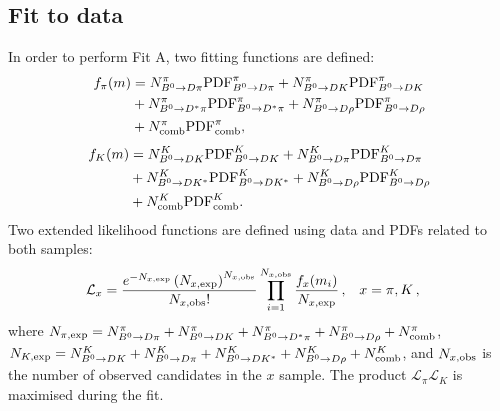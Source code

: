 \subsection{Fit to data}
\label{sec:DataMassFit}

In order to perform Fit A, two fitting functions are defined:
\begin{equation}
	\label{eq:PiSamplePDF}
	\begin{split}
		f_{\pi}(m) &= N^{\pi}_{B^0\rightarrow D\pi}{\rm{PDF}}^{\pi}_{B^0\rightarrow D\pi} + N^{\pi}_{B^0\rightarrow DK}{\rm{PDF}}^{\pi}_{B^0\rightarrow DK} \\
		& + N^{\pi}_{B^0\rightarrow D^*\pi}{\rm{PDF}}^{\pi}_{B^0\rightarrow D^*\pi} + N^{\pi}_{B^0\rightarrow D\rho}{\rm{PDF}}^{\pi}_{B^0\rightarrow D\rho} \\
		& + N^{\pi}_{\rm comb}{\rm{PDF}}^{\pi}_{\rm comb},
	\end{split}
\end{equation}
\begin{equation}
	\label{eq:KSamplePDF}
	\begin{split}
		f_{K}(m) &= N^{K}_{B^0\rightarrow DK}{\rm{PDF}}^{K}_{B^0\rightarrow DK} + N^{K}_{B^0\rightarrow D\pi}{\rm{PDF}}^{K}_{B^0\rightarrow D\pi} \\
		& +N^{K}_{B^0\rightarrow DK^*}{\rm{PDF}}^{K}_{B^0\rightarrow DK^*} + N^{K}_{B^0\rightarrow D\rho}{\rm{PDF}}^{K}_{B^0\rightarrow D\rho} \\
		& +N^{K}_{\rm comb}{\rm{PDF}}^{K}_{\rm comb}.
	\end{split}
\end{equation}
Two extended likelihood functions are defined using data and PDFs related to both samples:
\begin{align}
	\mathcal L_{x} &= \frac{e^{-N_{x,\rm exp}}\left(N_{x,\rm exp}\right)^{N_{x,\rm obs}}}{N_{x,\rm obs}!} \prod\limits_{i=1}^{N_{x,\rm obs}}\frac{f_{x}(m_i)}{N_{x,\rm exp}}\,, & x &= \pi, K\,,
\end{align}
where $N_{\pi,\rm exp}=N^{\pi}_{B^0\rightarrow D\pi}+N^{\pi}_{B^0\rightarrow DK}+N^{\pi}_{B^0\rightarrow D^*\pi}+N^{\pi}_{B^0\rightarrow D\rho}+N^{\pi}_{\rm comb}$,
$N_{K,\rm exp}=N^{K}_{B^0\rightarrow DK}+N^{K}_{B^0\rightarrow D\pi}+N^{K}_{B^0\rightarrow DK^*}+N^{K}_{B^0\rightarrow D\rho}+N^{K}_{\rm comb}$, and 
$N_{x,\rm obs}$ is the number of observed candidates in the $x$ sample.
The product $\mathcal L_{\pi}\mathcal L_{K}$ is maximised during the fit.

